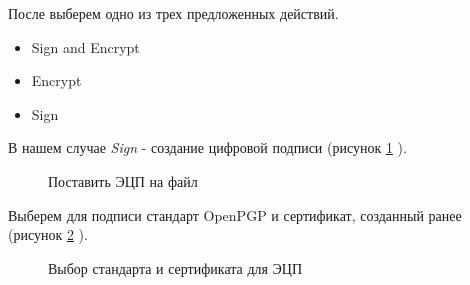 \documentclass[10pt,a4paper]{report}
\begin{document}
После выберем одно из трех предложенных действий.
\begin{itemize}
\item Sign and Encrypt
\item Encrypt
\item Sign
\end{itemize} 
В нашем случае \textit{Sign} - создание цифровой подписи (рисунок \ref{ris:image7} ).
\begin{figure}[h]
\caption{Поставить ЭЦП на файл}
\label{ris:image7}
\end{figure}

Выберем для подписи стандарт OpenPGP и сертификат, созданный ранее (рисунок \ref{ris:image8} ).
\begin{figure}[h]	
\caption{Выбор стандарта и сертификата для ЭЦП}
\label{ris:image8}
\end{figure}
\end{document}
